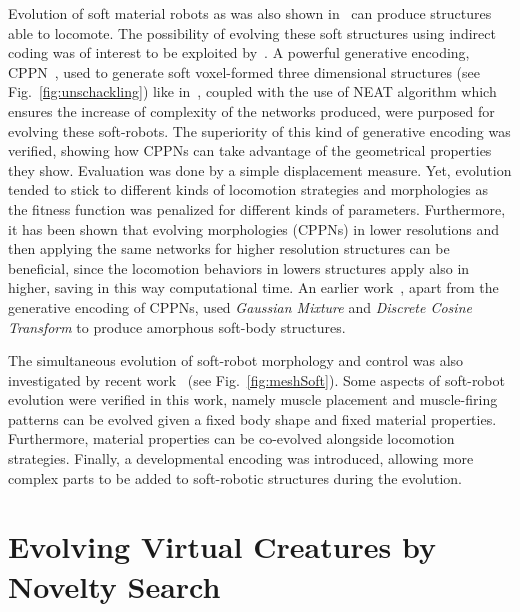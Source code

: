 Evolution of soft material robots as was also shown in~\citep{hiller2012automatic} can produce structures able to locomote. The possibility of evolving these soft structures using indirect coding was of interest to be exploited by~\citep{cheney2013unshackling}. A powerful generative encoding, CPPN~\citep{stanley2007compositional}, used to generate soft voxel-formed three dimensional structures (see Fig.~\ref{fig:unschackling}) like in~\citep{hiller2012automatic}, coupled with the use of NEAT algorithm which ensures the increase of complexity of the networks produced, were purposed for evolving these soft-robots. The superiority of this kind of generative encoding was verified, showing how CPPNs can take advantage of the geometrical properties they show. Evaluation was done by a simple displacement measure. Yet, evolution tended to stick to different kinds of locomotion strategies and morphologies as the fitness function was penalized for different kinds of parameters. Furthermore, it has been shown that evolving morphologies (CPPNs) in lower resolutions and then applying the same networks for higher resolution structures can be beneficial, since the locomotion behaviors in lowers structures apply also in higher, saving in this way computational time.  An earlier work~\citep{hiller2010evolving}, apart from the generative encoding of CPPNs, used \textit{Gaussian Mixture} and \textit{Discrete Cosine Transform} to produce amorphous soft-body structures.

The simultaneous evolution of soft-robot morphology and control was also investigated by recent work~\citep{rieffel2014growing} (see Fig.~\ref{fig:meshSoft}). Some aspects of soft-robot evolution were verified in this work, namely muscle placement and muscle-firing patterns can be evolved given a fixed body shape and fixed material properties. Furthermore, material properties can be co-evolved alongside locomotion strategies. Finally, a developmental encoding was introduced, allowing more complex parts to be added to soft-robotic structures during the evolution.


\section{Evolving Virtual Creatures by Novelty Search}

